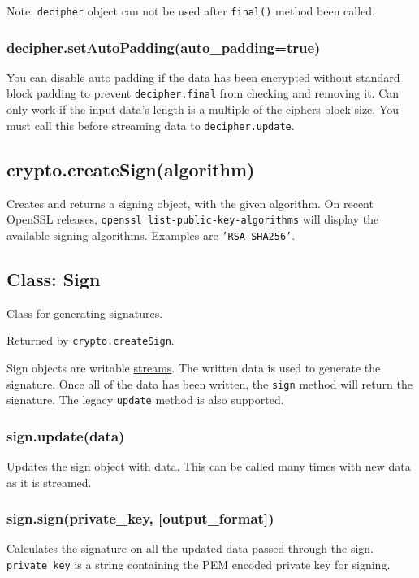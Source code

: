 Note: \texttt{decipher} object can not be used after \texttt{final()}
method been called.

\subsubsection{decipher.setAutoPadding(auto\_padding=true)}

You can disable auto padding if the data has been encrypted without
standard block padding to prevent \texttt{decipher.final} from checking
and removing it. Can only work if the input data's length is a multiple
of the ciphers block size. You must call this before streaming data to
\texttt{decipher.update}.

\subsection{crypto.createSign(algorithm)}

Creates and returns a signing object, with the given algorithm. On
recent OpenSSL releases, \texttt{openssl list-public-key-algorithms}
will display the available signing algorithms. Examples are
\texttt{'RSA-SHA256'}.

\subsection{Class: Sign}

Class for generating signatures.

Returned by \texttt{crypto.createSign}.

Sign objects are writable \href{stream.html}{streams}. The written data
is used to generate the signature. Once all of the data has been
written, the \texttt{sign} method will return the signature. The legacy
\texttt{update} method is also supported.

\subsubsection{sign.update(data)}

Updates the sign object with data. This can be called many times with
new data as it is streamed.

\subsubsection{sign.sign(private\_key, {[}output\_format{]})}

Calculates the signature on all the updated data passed through the
sign. \texttt{private\_key} is a string containing the PEM encoded
private key for signing.

